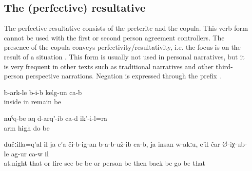 
\subsection{The (perfective) resultative}
\label{ssec:The (perfective) resultative}

The perfective resultative consists of the preterite and the copula. This verb form cannot be used with the first or second person agreement controllers. The presence of the copula conveys perfectivity/resultativity, i.e. the focus is on the result of a situation . This form is usually not used in personal narratives, but it is very frequent in other texts such as traditional narratives and other third-person perspective narrations. Negation is expressed through the prefix  .
%
\begin{exe}
	\ex	\label{ex:(The color) has remained inside}
	\gll	b-ark-le	b-i-b	kelg-un	ca-b\\
		inside	in	remain	be\\
	\glt	{}

	\ex	\label{ex:He has also taken up his hands}
	\gll	nuˁq-be	aq	d-arq'-ib	ca-d	ik'-i-l=ra\\
		arm	high	do	be	\\
	\glt	{}
	
	\ex	\label{ex:‎‎‎It was at night, there was no fire visible, nobody is there, then he turned and came back}
	\gll	dučːilla=q'al	il	ja	c'a	či-b-ig-an	b-a-b-už-ib	ca-b,		ja	insan	w-akːu,		c'il	čar	Ø-iχ-ub-le	ag-ur	ca-w	il\\
		at.night	that	or	fire	see	be	be		or	person	\tsc{m-}be	then	back	be	go	be	that\\
	\glt	{}
\end{exe}


